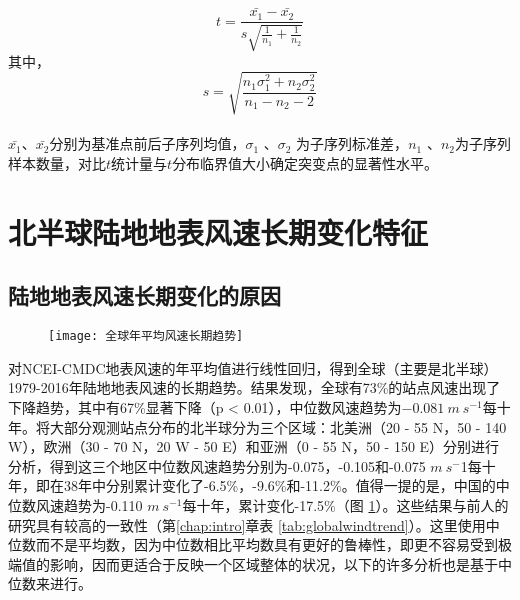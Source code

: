\begin{equation} \label{eq:mvttest}
t = \frac{\bar{x_{1}} - \bar{x_{2}}}{ s \sqrt{\frac{1}{n_{1}} + \frac{1}{n_{2}}}}
\end{equation} 
其中，
\begin{equation} 
s = \sqrt{\frac{n_{1}\sigma_{1}^{2} + n_{2}\sigma_{2}^{2}}{n_{1} - n_{2} - 2}}
\end{equation} ~\\
$\bar{x_{1}}$、$\bar{x_{2}}$分别为基准点前后子序列均值，$\sigma_{1}$ 、$\sigma_{2}$  为子序列标准差，$n_{1}$ 、$n_{2}$为子序列样本数量，对比$t$统计量与$t$分布临界值大小确定突变点的显著性水平。

\section{北半球陆地地表风速长期变化特征}\label{sec:NHwindchange}

\subsection{陆地地表风速长期变化的原因}

\begin{figure}[!b]
    \centering
    \texttt{[image: 全球年平均风速长期趋势]}
    \label{fig:NHwindtrend}
\end{figure}

对NCEI-CMDC地表风速的年平均值进行线性回归，得到全球（主要是北半球）1979-2016年陆地地表风速的长期趋势。结果发现，全球有73\%的站点风速出现了下降趋势，其中有67\%显著下降（p < 0.01），中位数风速趋势为$ -0.081 ~ m ~ s^{-1}$每十年。将大部分观测站点分布的北半球分为三个区域：北美洲（20 - 55 N，50 - 140 W），欧洲（30 - 70 N，20 W - 50 E）和亚洲（0 - 55 N，50 - 150 E）分别进行分析，得到这三个地区中位数风速趋势分别为-0.075，-0.105和-0.075 $m ~ s^{-}$1每十年，即在38年中分别累计变化了-6.5\%，-9.6\%和-11.2\%。值得一提的是，中国的中位数风速趋势为-0.110 $m ~ s^{-1}$每十年，累计变化-17.5\%（图 \ref{fig:NHwindtrend}）。这些结果与前人的研究具有较高的一致性（第\ref{chap:intro}章\;表 \ref{tab:globalwindtrend}）。这里使用中位数而不是平均数，因为中位数相比平均数具有更好的鲁棒性，即更不容易受到极端值的影响，因而更适合于反映一个区域整体的状况，以下的许多分析也是基于中位数来进行。

